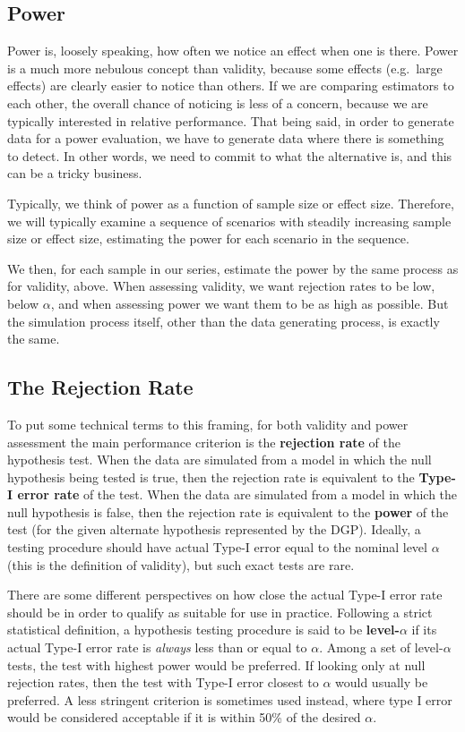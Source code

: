 \documentclass[
]{book}
\begin{document}
\subsection{Power}\label{power}

Power is, loosely speaking, how often we notice an effect when one is there.
Power is a much more nebulous concept than validity, because some effects (e.g.~large effects) are clearly easier to notice than others.
If we are comparing estimators to each other, the overall chance of noticing is less of a concern, because we are typically interested in relative performance.
That being said, in order to generate data for a power evaluation, we have to generate data where there is something to detect.
In other words, we need to commit to what the alternative is, and this can be a tricky business.

Typically, we think of power as a function of sample size or effect size. Therefore, we will typically examine a sequence of scenarios with steadily increasing sample size or effect size, estimating the power for each scenario in the sequence.

We then, for each sample in our series, estimate the power by the same process as for validity, above.
When assessing validity, we want rejection rates to be low, below \(\alpha\), and when assessing power we want them to be as high as possible. But the simulation process itself, other than the data generating process, is exactly the same.

\subsection{The Rejection Rate}\label{the-rejection-rate}

To put some technical terms to this framing, for both validity and power assessment the main performance criterion is the \textbf{rejection rate} of the hypothesis test. When the data are simulated from a model in which the null hypothesis being tested is true, then the rejection rate is equivalent to the \textbf{Type-I error rate} of the test. When the data are simulated from a model in which the null hypothesis is false, then the rejection rate is equivalent to the \textbf{power} of the test (for the given alternate hypothesis represented by the DGP).
Ideally, a testing procedure should have actual Type-I error equal to the nominal level \(\alpha\) (this is the definition of validity), but such exact tests are rare.

There are some different perspectives on how close the actual Type-I error rate should be in order to qualify as suitable for use in practice. Following a strict statistical definition, a hypothesis testing procedure is said to be \textbf{level-\(\alpha\)} if its actual Type-I error rate is \emph{always} less than or equal to \(\alpha\).
Among a set of level-\(\alpha\) tests, the test with highest power would be preferred.
If looking only at null rejection rates, then the test with Type-I error closest to \(\alpha\) would usually be preferred.
A less stringent criterion is sometimes used instead, where type I error would be considered acceptable if it is within 50\% of the desired \(\alpha\).
\end{document}
